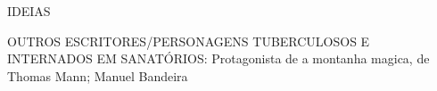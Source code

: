 IDEIAS

OUTROS ESCRITORES/PERSONAGENS TUBERCULOSOS E INTERNADOS EM SANATÓRIOS: Protagonista de a montanha magica, de Thomas Mann; Manuel Bandeira